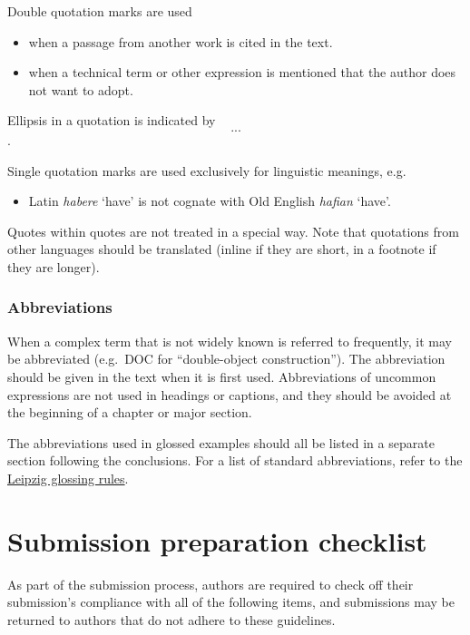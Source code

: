 \documentclass[cm,linguex]{glossa}
\providecommand{\tightlist}{%
  \setlength{\itemsep}{0pt}\setlength{\parskip}{0pt}}
\begin{document}
Double quotation marks are used

\begin{itemize}
\item
  when a passage from another work is cited in the text.
\item
  when a technical term or other expression is mentioned that the author
  does not want to adopt.
\end{itemize}

Ellipsis in a quotation is indicated by \[...\].

Single quotation marks are used exclusively for linguistic meanings,
e.g.

\begin{itemize}
\tightlist
\item
  Latin \emph{habere} `have' is not cognate with Old English
  \emph{hafian} `have'.
\end{itemize}

Quotes within quotes are not treated in a special way. Note that
quotations from other languages should be translated (inline if they are
short, in a footnote if they are longer).

\hypertarget{abbreviations}{%
\subsubsection{Abbreviations}\label{abbreviations}}

When a complex term that is not widely known is referred to frequently,
it may be abbreviated (e.g.~DOC for ``double-object construction''). The
abbreviation should be given in the text when it is first used.
Abbreviations of uncommon expressions are not used in headings or
captions, and they should be avoided at the beginning of a chapter or
major section.

The abbreviations used in glossed examples should all be listed in a
separate section following the conclusions. For a list of standard
abbreviations, refer to the
\href{https://www.eva.mpg.de/lingua/resources/glossing-rules.php}{Leipzig
glossing rules}.

\hypertarget{submission-preparation-checklist}{%
\section{Submission preparation
checklist}\label{submission-preparation-checklist}}

As part of the submission process, authors are required to check off
their submission's compliance with all of the following items, and
submissions may be returned to authors that do not adhere to these
guidelines.
\end{document}
